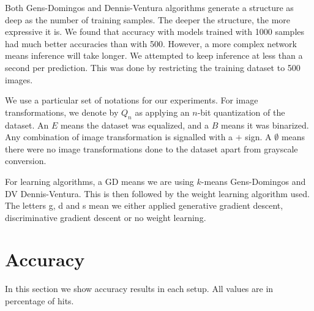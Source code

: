 Both Gens-Domingos and Dennis-Ventura algorithms generate a structure as deep as the number of
training samples. The deeper the structure, the more expressive it is. We found that accuracy with
models trained with 1000 samples had much better accuracies than with 500. However, a more complex
network means inference will take longer. We attempted to keep inference at less than a second per
prediction. This was done by restricting the training dataset to 500 images.

We use a particular set of notations for our experiments. For image transformations, we denote by
$Q_n$ as applying an $n$-bit quantization of the dataset. An $E$ means the dataset was equalized,
and a $B$ means it was binarized. Any combination of image transformation is signalled with a $+$
sign. A $\emptyset$ means there were no image transformations done to the dataset apart from
grayscale conversion.

For learning algorithms, a GD means we are using $k$-means Gens-Domingos and DV Dennis-Ventura.
This is then followed by the weight learning algorithm used. The letters g, d and s mean we either
applied generative gradient descent, discriminative gradient descent or no weight learning.

\section{Accuracy}

In this section we show accuracy results in each setup. All values are in percentage of hits.

